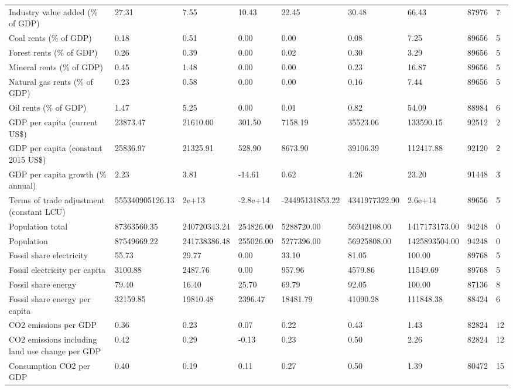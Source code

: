 \begin{longtable}{lllllllll}
Industry value added (\% of GDP) & 27.31 & 7.55 & 10.43 & 22.45 & 30.48 & 66.43 & 87976 & 7\\
Coal rents (\% of GDP) & 0.18 & 0.51 & 0.00 & 0.00 & 0.08 & 7.25 & 89656 & 5\\
Forest rents (\% of GDP) & 0.26 & 0.39 & 0.00 & 0.02 & 0.30 & 3.29 & 89656 & 5\\
\addlinespace
Mineral rents (\% of GDP) & 0.45 & 1.48 & 0.00 & 0.00 & 0.23 & 16.87 & 89656 & 5\\
Natural gas rents (\% of GDP) & 0.23 & 0.58 & 0.00 & 0.00 & 0.16 & 7.44 & 89656 & 5\\
Oil rents (\% of GDP) & 1.47 & 5.25 & 0.00 & 0.01 & 0.82 & 54.09 & 88984 & 6\\
GDP per capita (current US\$) & 23873.47 & 21610.00 & 301.50 & 7158.19 & 35523.06 & 133590.15 & 92512 & 2\\
GDP per capita (constant 2015 US\$) & 25836.97 & 21325.91 & 528.90 & 8673.90 & 39106.39 & 112417.88 & 92120 & 2\\
\addlinespace
GDP per capita growth (\% annual) & 2.23 & 3.81 & -14.61 & 0.62 & 4.26 & 23.20 & 91448 & 3\\
Terms of trade adjustment (constant LCU) & 555340905126.13 & 2e+13 & -2.8e+14 & -24495131853.22 & 4341977322.90 & 2.6e+14 & 89656 & 5\\
Population total & 87363560.35 & 240720343.24 & 254826.00 & 5288720.00 & 56942108.00 & 1417173173.00 & 94248 & 0\\
Population & 87549669.22 & 241738386.48 & 255026.00 & 5277396.00 & 56925808.00 & 1425893504.00 & 94248 & 0\\
Fossil share electricity & 55.73 & 29.77 & 0.00 & 33.10 & 81.05 & 100.00 & 89768 & 5\\
\addlinespace
Fossil electricity per capita & 3100.88 & 2487.76 & 0.00 & 957.96 & 4579.86 & 11549.69 & 89768 & 5\\
Fossil share energy & 79.40 & 16.40 & 25.70 & 69.79 & 92.05 & 100.00 & 87136 & 8\\
Fossil share energy per capita & 32159.85 & 19810.48 & 2396.47 & 18481.79 & 41090.28 & 111848.38 & 88424 & 6\\
CO2 emissions per GDP & 0.36 & 0.23 & 0.07 & 0.22 & 0.43 & 1.43 & 82824 & 12\\
CO2 emissions including land use change per GDP & 0.42 & 0.29 & -0.13 & 0.23 & 0.50 & 2.26 & 82824 & 12\\
\addlinespace
Consumption CO2 per GDP & 0.40 & 0.19 & 0.11 & 0.27 & 0.50 & 1.39 & 80472 & 15\\

\end{longtable}
